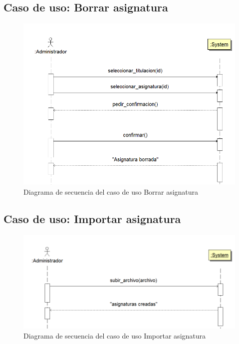\documentclass{book}
\begin{document}
\subsection{Caso de uso: Borrar asignatura}
\begin{figure}[H] 
  \label{comportamiento-borrar-asignatura} 
	\begin{center}
    \includegraphics[scale=0.5]{./secuencia-borrar-asignatura.png}
  \end{center}
\caption{Diagrama de secuencia del caso de uso Borrar asignatura}
\end{figure}

\subsection{Caso de uso: Importar asignatura}
\begin{figure}[H] 
  \label{comportamiento-importar-asignatura} 
	\begin{center}
    \includegraphics[scale=0.5]{./secuencia-importar-asignatura.png}
  \end{center}
\caption{Diagrama de secuencia del caso de uso Importar asignatura}
\end{figure}
\end{document}
